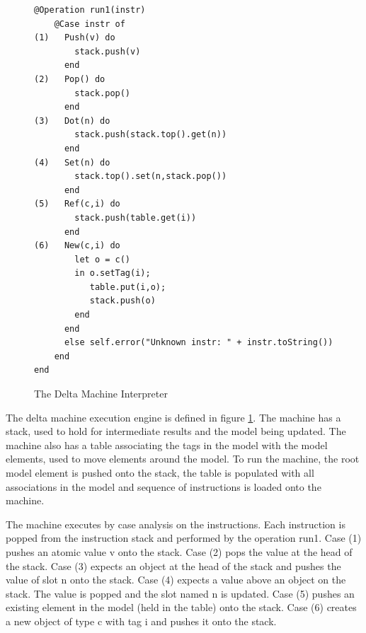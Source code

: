 %
\begin{figure}
\hfill{}\begin{lstlisting}
@Operation run1(instr)
    @Case instr of
(1)   Push(v) do
        stack.push(v)
      end
(2)   Pop() do
        stack.pop()
      end
(3)   Dot(n) do
        stack.push(stack.top().get(n))
      end
(4)   Set(n) do
        stack.top().set(n,stack.pop())
      end
(5)   Ref(c,i) do
        stack.push(table.get(i))
      end
(6)   New(c,i) do
        let o = c()
        in o.setTag(i);
           table.put(i,o);
           stack.push(o)
        end
      end
      else self.error("Unknown instr: " + instr.toString())
    end
end
\end{lstlisting}\hfill{}

\caption{The Delta Machine Interpreter\label{fig:The-Delta-Machine}}

\end{figure}


The delta machine execution engine is defined in figure \ref{fig:The-Delta-Machine}.
The machine has a stack, used to hold for intermediate results and
the model being updated. The machine also has a table associating
the tags in the model with the model elements, used to move elements
around the model. To run the machine, the root model element is pushed
onto the stack, the table is populated with all associations in the
model and sequence of instructions is loaded onto the machine.

The machine executes by case analysis on the instructions. Each instruction
is popped from the instruction stack and performed by the operation
run1. Case (1) pushes an atomic value v onto the stack. Case (2) pops
the value at the head of the stack. Case (3) expects an object at
the head of the stack and pushes the value of slot n onto the stack.
Case (4) expects a value above an object on the stack. The value is
popped and the slot named n is updated. Case (5) pushes an existing
element in the model (held in the table) onto the stack. Case (6)
creates a new object of type c with tag i and pushes it onto the stack.

